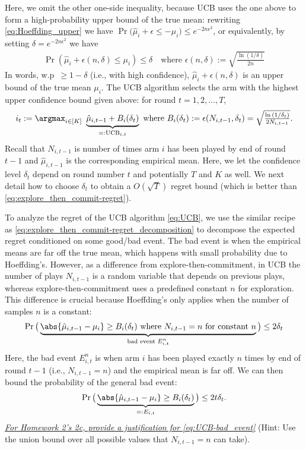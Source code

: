 Here, we omit the other one-side inequality, because UCB uses the one above to form a high-probability upper bound of the true mean: rewriting \eqref{eq:Hoeffding_upper} we have $\Pr\big(\hat{\mu}_i+ \epsilon \leq -\mu_i \big) \leq e^{-2 n \epsilon^2}$, or equivalently, by setting $\delta=e^{-2 n \epsilon^2}$ we have
\begin{align}
\label{eq:upper_confidence_bound}
    \Pr\left(\hat{\mu}_i+ \epsilon(n,\delta) \leq \mu_i \right) \leq \delta \quad \text{where } \epsilon(n,\delta):=\sqrt{\tfrac{\ln{(1/\delta)}}{2n}}
\end{align}
In words, w.p~$\geq 1-\delta$ (i.e., with high confidence),  $\hat{\mu}_i+ \epsilon(n,\delta)$ is an upper bound of the true mean $\mu_i$.
The UCB algorithm selects the arm with the highest upper confidence bound given above: for round $t=1,2,\ldots,T$,
\begin{align}
\label{eq:UCB}
   i_t:=\argmax_{i \in[K]}~ \underbrace{\hat{\mu}_{i, t-1}+B_i(\delta_t)}_{=:{\rm UCB}_{i, t}} \text{ where }
   B_i(\delta_t):= \epsilon(N_{i,t-1}, \delta_t) = \sqrt{\tfrac{\ln{(1/\delta_t)}}{2N_{i,t-1}}}
   .
\end{align}
Recall that $N_{i,t-1}$ is number of times arm $i$ has been played by end of round $t-1$ and $\hat{\mu}_{i,t-1}$ is the corresponding empirical mean.
Here, we let the confidence level $\delta_t$ depend on round number $t$ and potentially $T$ and $K$ as well.
We next detail how to choose $\delta_t$ to obtain a $O(\sqrt{T})$ regret bound (which is better than \eqref{eq:explore_then_commit-regret}).

To analyze the regret of the UCB algorithm \eqref{eq:UCB}, we use the similar recipe as \eqref{eq:explore_then_commit-regret_decomposition} to decompose the expected regret conditioned on some good/bad event.
The bad event is when the empirical means are far off the true mean, which happens with small probability due to Hoeffding's.
However, as a difference from explore-then-commitment, in UCB the number of plays $N_{i,t-1}$ is a random variable that depends on previous plays, whereas explore-then-commitment uses a predefined constant $n$ for exploration.
This difference is crucial because Hoeffding's only applies when the number of samples $n$ is a constant:
\begin{align*}
    \Pr\big(\underbrace{\abs{\hat{\mu}_{i, t-1}-\mu_i} \geq B_i(\delta_t) \text { where $N_{i, t-1}=n$ for constant $n$}}_{\text{bad event $E_{i,t}^n$}}\big) \leq 2 \delta_t
\end{align*}
Here, the bad event $E_{i,t}^n$ is when arm $i$ has been played exactly $n$ times by end of round $t-1$ (i.e., $N_{i, t-1}=n$) and the empirical mean is far off.
We can then bound the probability of the general bad event:
\begin{align}
\label{eq:UCB-bad_event}
    \Pr\big(\underbrace{\abs{\hat{\mu}_{i, t-1}-\mu_i} \geq B_i(\delta_t)}_{=:E_{i,t}} \big)\leq 2t\delta_t
    .
\end{align}
\underline{\em For Homework 2's 2c, provide a justification for \eqref{eq:UCB-bad_event}} (Hint: Use the union bound over all possible values that $N_{i, t-1}=n$ can take).

